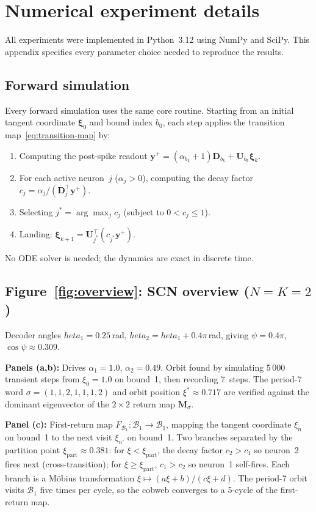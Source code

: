 \documentclass[12pt]{article}
\newcommand{\vv}[1]{\mathbf{#1}}
\newcommand{\DD}{\vv{D}}
\newcommand{\yy}{\vv{y}}
\newcommand{\xxi}{\boldsymbol{\xi}}
\newcommand{\Bsp}{\mathcal{B}}
\begin{document}
\section{Numerical experiment details}\label{app:numerics}

All experiments were implemented in Python~3.12 using NumPy and SciPy. This appendix specifies every parameter choice needed to reproduce the results.

\subsection{Forward simulation}\label{app:forward-sim}

Every forward simulation uses the same core routine. Starting from an initial tangent coordinate $\xxi_0$ and bound index $b_0$, each step applies the transition map~\eqref{eq:transition-map} by:
\begin{enumerate}[nosep]
    \item Computing the post-spike readout $\yy^+=(\alpha_{b_k}+1)\DD_{b_k}+\vv{U}_{b_k}\xxi_k$.
    \item For each active neuron~$j$ ($\alpha_j>0$), computing the decay factor $c_j=\alpha_j/(\DD_j^\top\yy^+)$.
    \item Selecting $j^*=\arg\max_j c_j$ (subject to $0<c_j\leq 1$).
    \item Landing: $\xxi_{k+1}=\vv{U}_{j^*}^\top(c_{j^*}\yy^+)$.
\end{enumerate}
No ODE solver is needed; the dynamics are exact in discrete time.

\subsection{Figure~\ref{fig:overview}: SCN overview ($N{=}K{=}2$)}\label{app:fig-overview}

Decoder angles $	heta_1=0.25$\,rad, $	heta_2=	heta_1+0.4\pi$\,rad, giving $\psi=0.4\pi$, $\cos\psi\approx 0.309$.

\textbf{Panels (a,b):} Drives $\alpha_1=1.0$, $\alpha_2=0.49$. Orbit found by simulating 5\,000 transient steps from $\xi_0=1.0$ on bound~1, then recording 7~steps. The period-7 word $\sigma=(1,1,2,1,1,1,2)$ and orbit position $\xi^*\approx 0.717$ are verified against the dominant eigenvector of the $2\times 2$ return map $\vv{M}_\sigma$.

\textbf{Panel (c):} First-return map $F_{\!\Bsp_1}:\Bsp_1\to\Bsp_1$, mapping the tangent coordinate $\xi_n$ on bound~1 to the next visit $\xi_{n'}$ on bound~1. Two branches separated by the partition point $\xi_{\mathrm{part}}\approx 0.381$: for $\xi<\xi_{\mathrm{part}}$, the decay factor $c_2>c_1$ so neuron~2 fires next (cross-transition); for $\xi\geq\xi_{\mathrm{part}}$, $c_1>c_2$ so neuron~1 self-fires. Each branch is a M\"obius transformation $\xi\mapsto(a\xi+b)/(c\xi+d)$. The period-7 orbit visits $\Bsp_1$ five times per cycle, so the cobweb converges to a 5-cycle of the first-return map.
\end{document}
